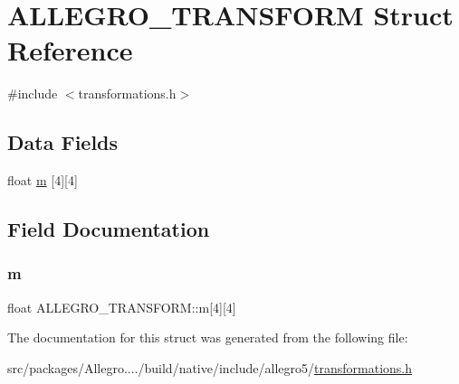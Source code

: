 \hypertarget{struct_a_l_l_e_g_r_o___t_r_a_n_s_f_o_r_m}{}\section{A\+L\+L\+E\+G\+R\+O\+\_\+\+T\+R\+A\+N\+S\+F\+O\+RM Struct Reference}
\label{struct_a_l_l_e_g_r_o___t_r_a_n_s_f_o_r_m}


{\ttfamily \#include $<$transformations.\+h$>$}

\subsection*{Data Fields}
\begin{DoxyCompactItemize}
\item 
float \hyperlink{struct_a_l_l_e_g_r_o___t_r_a_n_s_f_o_r_m_a42c2dabdbf8134e2b51d3862aa1d9069}{m} \mbox{[}4\mbox{]}\mbox{[}4\mbox{]}
\end{DoxyCompactItemize}


\subsection{Field Documentation}
\mbox{\label{struct_a_l_l_e_g_r_o___t_r_a_n_s_f_o_r_m_a42c2dabdbf8134e2b51d3862aa1d9069}} 
\subsubsection{\texorpdfstring{m}{m}}
{\footnotesize\ttfamily float A\+L\+L\+E\+G\+R\+O\+\_\+\+T\+R\+A\+N\+S\+F\+O\+R\+M\+::m\mbox{[}4\mbox{]}\mbox{[}4\mbox{]}}



The documentation for this struct was generated from the following file\+:\begin{DoxyCompactItemize}
\item 
src/packages/\+Allegro..../build/native/include/allegro5/\hyperlink{transformations_8h}{transformations.\+h}\end{DoxyCompactItemize}

